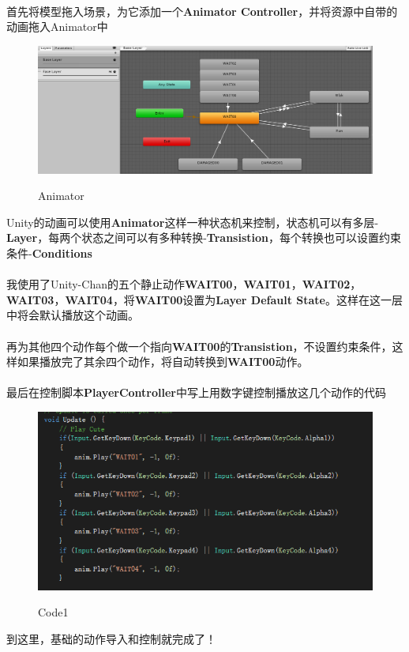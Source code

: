 \documentclass{article}
\begin{document}
\paragraph{}
首先将模型拖入场景，为它添加一个\textbf{Animator Controller}，并将资源中自带的动画拖入Animator中
\begin{figure}[H]
  \centering
  \includegraphics[width=13cm]{Animator.png}\\
  \caption{Animator}\label{2-1}
\end{figure}
Unity的动画可以使用\textbf{Animator}这样一种状态机来控制，状态机可以有多层-\textbf{Layer}，每两个状态之间可以有多种转换-\textbf{Transistion}，每个转换也可以设置约束条件-\textbf{Conditions}
\paragraph{}
我使用了Unity-Chan的五个静止动作\textbf{WAIT00}，\textbf{WAIT01}，\textbf{WAIT02}，\textbf{WAIT03}，\textbf{WAIT04}，将\textbf{WAIT00}设置为\textbf{Layer Default State}。这样在这一层中将会默认播放这个动画。
\paragraph{}
再为其他四个动作每个做一个指向\textbf{WAIT00}的\textbf{Transistion}，不设置约束条件，这样如果播放完了其余四个动作，将自动转换到\textbf{WAIT00}动作。
\paragraph{}
最后在控制脚本\textbf{PlayerController}中写上用数字键控制播放这几个动作的代码
\begin{figure}[H]
  \centering
  \includegraphics[width=13cm]{code1.png}\\
  \caption{Code1}\label{2-2}
\end{figure}
到这里，基础的动作导入和控制就完成了！
\end{document}
